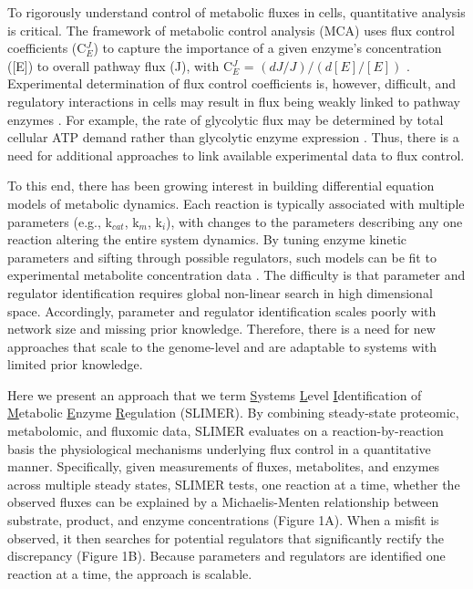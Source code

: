 To rigorously understand control of metabolic fluxes in cells, quantitative analysis is critical. The framework of metabolic control analysis (MCA) uses flux control coefficients (C$^{J}_{E}$) to capture the importance of a given enzyme's concentration ([E]) to overall pathway flux (J), with C$^{J}_{E}$  = $(dJ/J)/(d[E]/[E])$ \cite{Kacser:1973fe}. Experimental determination of flux control coefficients is, however, difficult, and regulatory interactions in cells may result in flux being weakly linked to pathway enzymes \cite{Hauf:2000vu, Kochanowski:2013fb, Fell:1997wg, CornishBowden:1995fy}. For example, the rate of glycolytic flux may be determined by total cellular ATP demand rather than glycolytic enzyme expression \cite{Koebmann:2002ic}. Thus, there is a need for additional approaches to link available experimental data to flux control.

To this end, there has been growing interest in building differential equation models of metabolic dynamics. Each reaction is typically associated with multiple parameters (e.g., k$_{cat}$, k$_{m}$, k$_{i}$), with changes to the parameters describing any one reaction altering the entire system dynamics. By tuning enzyme kinetic parameters and sifting through possible regulators, such models can be fit to experimental metabolite concentration data \cite{Teusink:2000kc, Chassagnole:2002ty, Tummler:2014cp}. The difficulty is that parameter and regulator identification requires global non-linear search in high dimensional space. Accordingly, parameter and regulator identification scales poorly with network size and missing prior knowledge. Therefore, there is a need for new approaches that scale to the genome-level and are adaptable to systems with limited prior knowledge.

Here we present an approach that we term \underline{S}ystems \underline{L}evel \underline{I}dentification of \underline{M}etabolic \underline{E}nzyme \underline{R}egulation (SLIMER). By combining steady-state proteomic, metabolomic, and fluxomic data, SLIMER evaluates on a reaction-by-reaction basis the physiological mechanisms underlying flux control in a quantitative manner. Specifically, given measurements of fluxes, metabolites, and enzymes across multiple steady states, SLIMER tests, one reaction at a time, whether the observed fluxes can be explained by a Michaelis-Menten relationship between substrate, product, and enzyme concentrations (Figure 1A). When a misfit is observed, it then searches for potential regulators that significantly rectify the discrepancy (Figure 1B). Because parameters and regulators are identified one reaction at a time, the approach is scalable. 


